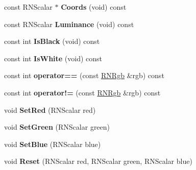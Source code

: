 \begin{DoxyCompactItemize}
\item 
const R\+N\+Scalar $\ast$ {\bfseries Coords} (void) const \hypertarget{class_r_n_rgb_aab70ada53da78064de979f943cc971d5}{}\label{class_r_n_rgb_aab70ada53da78064de979f943cc971d5}

\item 
const R\+N\+Scalar {\bfseries Luminance} (void) const \hypertarget{class_r_n_rgb_a1b12fc52b9b50bf770dfae6524ac24d0}{}\label{class_r_n_rgb_a1b12fc52b9b50bf770dfae6524ac24d0}

\item 
const int {\bfseries Is\+Black} (void) const \hypertarget{class_r_n_rgb_af8ae0800fe5790970753ded6062fcd9e}{}\label{class_r_n_rgb_af8ae0800fe5790970753ded6062fcd9e}

\item 
const int {\bfseries Is\+White} (void) const \hypertarget{class_r_n_rgb_ae8fc8505588e0776e95498beb8d0c84d}{}\label{class_r_n_rgb_ae8fc8505588e0776e95498beb8d0c84d}

\item 
const int {\bfseries operator==} (const \hyperlink{class_r_n_rgb}{R\+N\+Rgb} \&rgb) const \hypertarget{class_r_n_rgb_adf4903d7761f8ad4a9d825086e79253c}{}\label{class_r_n_rgb_adf4903d7761f8ad4a9d825086e79253c}

\item 
const int {\bfseries operator!=} (const \hyperlink{class_r_n_rgb}{R\+N\+Rgb} \&rgb) const \hypertarget{class_r_n_rgb_a271a789644e918d54e890df4c7ab7ccc}{}\label{class_r_n_rgb_a271a789644e918d54e890df4c7ab7ccc}

\item 
void {\bfseries Set\+Red} (R\+N\+Scalar red)\hypertarget{class_r_n_rgb_ab155cbab8afae45781a935a89203367e}{}\label{class_r_n_rgb_ab155cbab8afae45781a935a89203367e}

\item 
void {\bfseries Set\+Green} (R\+N\+Scalar green)\hypertarget{class_r_n_rgb_ab59808542ac163e7ae8852e199b3bce9}{}\label{class_r_n_rgb_ab59808542ac163e7ae8852e199b3bce9}

\item 
void {\bfseries Set\+Blue} (R\+N\+Scalar blue)\hypertarget{class_r_n_rgb_a553c9076d6907db0675201ac5974076b}{}\label{class_r_n_rgb_a553c9076d6907db0675201ac5974076b}

\item 
void {\bfseries Reset} (R\+N\+Scalar red, R\+N\+Scalar green, R\+N\+Scalar blue)\hypertarget{class_r_n_rgb_a3e7dd49665489f452c3cd70f0e2f6851}{}\label{class_r_n_rgb_a3e7dd49665489f452c3cd70f0e2f6851}


\end{DoxyCompactItemize}
